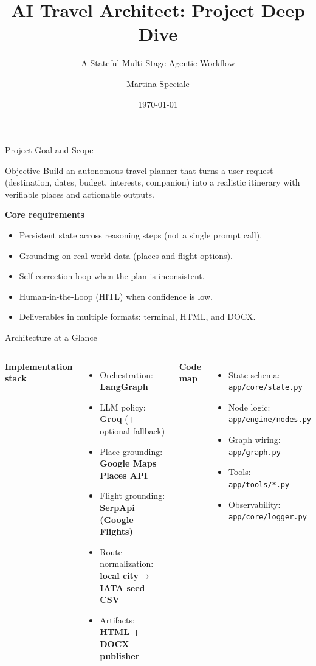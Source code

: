 \documentclass[9pt]{beamer}
\title[AI Travel Architect]{AI Travel Architect: Project Deep Dive}
\subtitle{A Stateful Multi-Stage Agentic Workflow}
\author{Martina Speciale}
\institute{Travel-Agent-AI}
\date{\today}
\begin{document}
\begin{frame}
    \titlepage
\end{frame}

\begin{frame}{Project Goal and Scope}
\begin{block}{Objective}
Build an autonomous travel planner that turns a user request
(destination, dates, budget, interests, companion) into a realistic itinerary
with verifiable places and actionable outputs.
\end{block}

\textbf{Core requirements}
\begin{itemize}
    \item Persistent state across reasoning steps (not a single prompt call).
    \item Grounding on real-world data (places and flight options).
    \item Self-correction loop when the plan is inconsistent.
    \item Human-in-the-Loop (HITL) when confidence is low.
    \item Deliverables in multiple formats: terminal, HTML, and DOCX.
\end{itemize}
\end{frame}

\begin{frame}{Architecture at a Glance}
\begin{columns}[t]
\textbf{Implementation stack}
\begin{itemize}
    \item Orchestration: \textbf{LangGraph}
    \item LLM policy: \textbf{Groq} (+ optional fallback)
    \item Place grounding: \textbf{Google Maps Places API}
    \item Flight grounding: \textbf{SerpApi (Google Flights)}
    \item Route normalization: \textbf{local city\(\to\)IATA seed CSV}
    \item Artifacts: \textbf{HTML + DOCX publisher}
\end{itemize}

\textbf{Code map}
\begin{itemize}
    \item State schema: \texttt{app/core/state.py}
    \item Node logic: \texttt{app/engine/nodes.py}
    \item Graph wiring: \texttt{app/graph.py}
    \item Tools: \texttt{app/tools/*.py}
    \item Observability: \texttt{app/core/logger.py}
\end{itemize}
\end{columns}
\end{frame}
\end{document}
